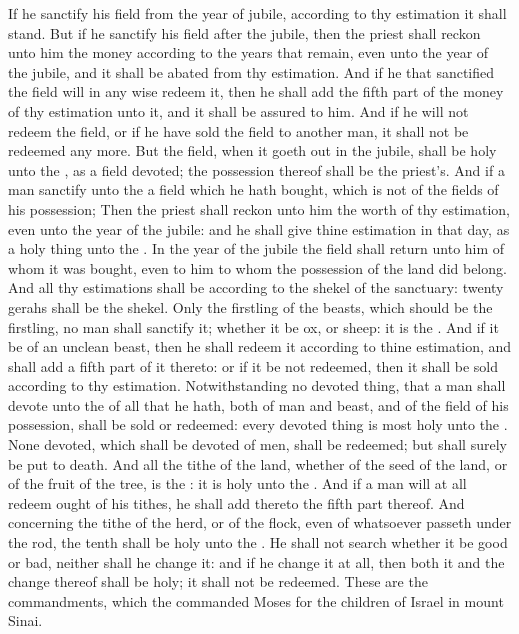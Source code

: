 \begin{biblechapter}
\verse If he sanctify his field from the year of jubile, according to thy estimation it shall stand.
\verse But if he sanctify his field after the jubile, then the priest shall reckon unto him the money according to the years that remain, even unto the year of the jubile, and it shall be abated from thy estimation.
\verse And if he that sanctified the field will in any wise redeem it, then he shall add the fifth part of the money of thy estimation unto it, and it shall be assured to him.
\verse And if he will not redeem the field, or if he have sold the field to another man, it shall not be redeemed any more.
\verse But the field, when it goeth out in the jubile, shall be holy unto the \LORD, as a field devoted; the possession thereof shall be the priest's.
\verse And if a man sanctify unto the \LORD a field which he hath bought, which is not of the fields of his possession;
\verse Then the priest shall reckon unto him the worth of thy estimation, even unto the year of the jubile: and he shall give thine estimation in that day, as a holy thing unto the \LORD.
\verse In the year of the jubile the field shall return unto him of whom it was bought, even to him to whom the possession of the land did belong.
\verse And all thy estimations shall be according to the shekel of the sanctuary: twenty gerahs shall be the shekel.
\verse Only the firstling of the beasts, which should be the \LORDs firstling, no man shall sanctify it; whether it be ox, or sheep: it is the \LORDs.
\verse And if it be of an unclean beast, then he shall redeem it according to thine estimation, and shall add a fifth part of it thereto: or if it be not redeemed, then it shall be sold according to thy estimation.
\verse Notwithstanding no devoted thing, that a man shall devote unto the \LORD of all that he hath, both of man and beast, and of the field of his possession, shall be sold or redeemed: every devoted thing is most holy unto the \LORD.
\verse None devoted, which shall be devoted of men, shall be redeemed; but shall surely be put to death.
\verse And all the tithe of the land, whether of the seed of the land, or of the fruit of the tree, is the \LORDs: it is holy unto the \LORD.
\verse And if a man will at all redeem ought of his tithes, he shall add thereto the fifth part thereof.
\verse And concerning the tithe of the herd, or of the flock, even of whatsoever passeth under the rod, the tenth shall be holy unto the \LORD.
\verse He shall not search whether it be good or bad, neither shall he change it: and if he change it at all, then both it and the change thereof shall be holy; it shall not be redeemed.
\verse These are the commandments, which the \LORD commanded Moses for the children of Israel in mount Sinai.
\end{biblechapter}
